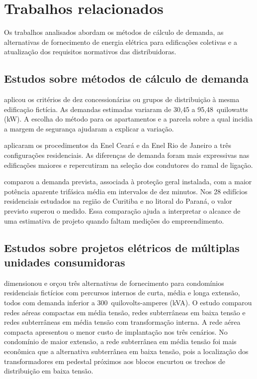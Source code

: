 \chapter{Trabalhos relacionados}
\label{cap:trabalhos-relacionados}

Os trabalhos analisados abordam os métodos de cálculo de demanda, as alternativas de fornecimento de energia elétrica para edificações coletivas e a atualização dos requisitos normativos das distribuidoras.

\section{Estudos sobre métodos de cálculo de demanda}
\label{sec:trabalhos-demanda}

 aplicou os critérios de dez concessionárias ou grupos de distribuição à mesma edificação fictícia. As demandas estimadas variaram de 30,45 a 95,48~quilowatts (kW). A escolha do método para os apartamentos e a parcela sobre a qual incidia a margem de segurança ajudaram a explicar a variação.

 aplicaram os procedimentos da Enel Ceará e da Enel Rio de Janeiro a três configurações residenciais. As diferenças de demanda foram mais expressivas nas edificações maiores e repercutiram na seleção dos condutores do ramal de ligação.

 comparou a demanda prevista, associada à proteção geral instalada, com a maior potência aparente trifásica média em intervalos de dez minutos. Nos 28 edifícios residenciais estudados na região de Curitiba e no litoral do Paraná, o valor previsto superou o medido. Essa comparação ajuda a interpretar o alcance de uma estimativa de projeto quando faltam medições do empreendimento.

\section{Estudos sobre projetos elétricos de múltiplas unidades consumidoras}
\label{sec:trabalhos-projetos}

 dimensionou e orçou três alternativas de fornecimento para condomínios residenciais fictícios com percursos internos de curta, média e longa extensão, todos com demanda inferior a 300~quilovolts-amperes (kVA). O estudo comparou redes aéreas compactas em média tensão, redes subterrâneas em baixa tensão e redes subterrâneas em média tensão com transformação interna. A rede aérea compacta apresentou o menor custo de implantação nos três cenários. No condomínio de maior extensão, a rede subterrânea em média tensão foi mais econômica que a alternativa subterrânea em baixa tensão, pois a localização dos transformadores em pedestal próximos aos blocos encurtou os trechos de distribuição em baixa tensão.

